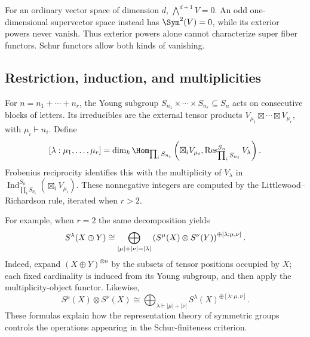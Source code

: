 \begin{example}
For an ordinary vector space of dimension $d$, $\bigwedge^{d+1}V=0$.
An odd one-dimensional supervector space instead has
$\Sym^2(V)=0$, while its exterior powers never vanish. Thus exterior
powers alone cannot characterize super fiber functors. Schur functors
allow both kinds of vanishing.
\end{example}

\subsection{Restriction, induction, and multiplicities}

For $n=n_1+\cdots+n_r$, the Young subgroup
$S_{n_1}\times\cdots\times S_{n_r}\subseteq S_n$ acts on consecutive
blocks of letters. Its irreducibles are the external tensor products
$V_{\mu_1}\boxtimes\cdots\boxtimes V_{\mu_r}$, with
$\mu_i\vdash n_i$. Define
\[
 [\lambda:\mu_1,\ldots,\mu_r]
 =\dim_k\Hom_{\prod_iS_{n_i}}
 \left(\boxtimes_iV_{\mu_i},
       \operatorname{Res}^{S_n}_{\prod_iS_{n_i}}V_\lambda\right).
\]
Frobenius reciprocity identifies this with the multiplicity of
$V_\lambda$ in
$\operatorname{Ind}^{S_n}_{\prod_iS_{n_i}}(\boxtimes_iV_{\mu_i})$.
These nonnegative integers are computed by the
Littlewood--Richardson rule, iterated when $r>2$.

For example, when $r=2$ the same decomposition yields
\[
 S^\lambda(X\oplus Y)\cong
 \bigoplus_{|\mu|+|\nu|=|\lambda|}
 \left(S^\mu(X)\otimes S^\nu(Y)\right)^%
 {\oplus[\lambda:\mu,\nu]}.
\]
Indeed, expand $(X\oplus Y)^{\otimes n}$ by the subsets of tensor
positions occupied by $X$; each fixed cardinality is induced from its
Young subgroup, and then apply the multiplicity-object functor.
Likewise,
\[
 S^\mu(X)\otimes S^\nu(X)\cong
 \bigoplus_{\lambda\vdash |\mu|+|\nu|}
 S^\lambda(X)^{\oplus[\lambda:\mu,\nu]}.
\]
These formulas explain how the representation theory of symmetric
groups controls the operations appearing in the Schur-finiteness
criterion.
